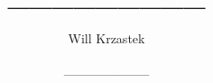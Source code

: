 \documentclass[11pt,a4paper]{article}
\begin{document}
 
\title{_________}
\author{Will Krzastek}
\date{_________}
\maketitle
\end{document}
